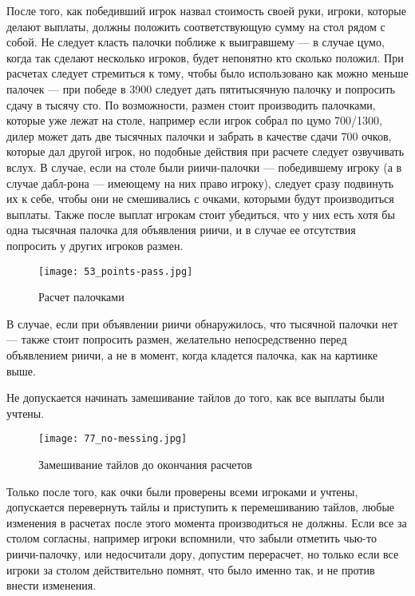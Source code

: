 После того, как победивший игрок назвал стоимость своей руки, игроки, которые делают выплаты, должны положить соответствующую сумму на стол рядом с собой. Не следует класть палочки поближе к выигравшему --- в случае цумо, когда так сделают несколько игроков, будет непонятно кто сколько положил. При расчетах следует стремиться к тому, чтобы было использовано как можно меньше палочек --- при победе в 3900 следует дать пятитысячную палочку и попросить сдачу в тысячу сто. По возможности, размен стоит производить палочками, которые уже лежат на столе, например если игрок собрал по цумо 700/1300, дилер может дать две тысячных палочки и забрать в качестве сдачи 700 очков, которые дал другой игрок, но подобные действия при расчете следует озвучивать вслух. В случае, если на столе были риичи-палочки --- победившему игроку (а в случае дабл-рона --- имеющему на них право игроку), следует сразу подвинуть их к себе, чтобы они не смешивались с очками, которыми будут производиться выплаты. Также после выплат игрокам стоит убедиться, что у них есть хотя бы одна тысячная палочка для объявления риичи, и в случае ее отсутствия попросить у других игроков размен.

\begin{figure}[H]
	\centering
	\texttt{[image: 53\_points-pass.jpg]}
	\caption{Расчет палочками}
\end{figure}

В случае, если при объявлении риичи обнаружилось, что тысячной палочки нет --- также стоит попросить размен, желательно непосредственно перед объявлением риичи, а не в момент, когда кладется палочка, как на картинке выше.

Не допускается начинать замешивание тайлов до того, как все выплаты были учтены.

\begin{figure}[H]
	\centering
	\texttt{[image: 77\_no-messing.jpg]}
	\caption{Замешивание тайлов до окончания расчетов}
\end{figure}

Только после того, как очки были проверены всеми игроками и учтены, допускается перевернуть тайлы и приступить к перемешиванию тайлов, любые изменения в расчетах после этого момента производиться не должны. Если все за столом согласны, например игроки вспомнили, что забыли отметить чью-то риичи-палочку, или недосчитали дору, допустим перерасчет, но только если все игроки за столом действительно помнят, что было именно так, и не против внести изменения.

\newpage

